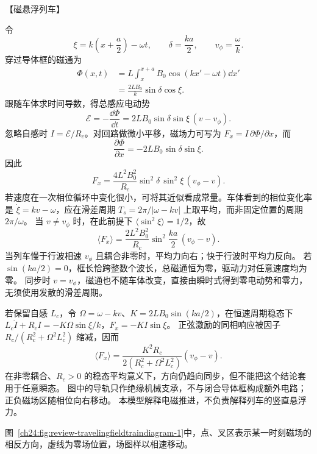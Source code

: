 {\begin{origexamplebox}{【磁悬浮列车】}
\end{origexamplebox}

\begin{xesolution}
\par\noindent\begin{minipage}{\linewidth}
\travelingFieldTrainDiagram
{}
\end{minipage}\par\medskip

令
\begin{equation}
  \xi=k\left(x+\frac a2\right)-\omega t,
  \qquad
  \delta=\frac{ka}{2},
  \qquad
  v_\phi=\frac\omega k.
\end{equation}
穿过导体框的磁通为
\begin{align}
  \Phi(x,t)
  &=L\int_x^{x+a}B_0\cos(kx'-\omega t)\dd x'\\
  &=\frac{2LB_0}{k}\sin\delta\cos\xi.
\end{align}
跟随车体求时间导数，得总感应电动势
\begin{equation}
  \mathcal E=-\frac{\dd\Phi}{\dd t}
  =2LB_0\sin\delta\sin\xi\,(v-v_\phi).
\end{equation}
忽略自感时 $I=\mathcal E/R_c$。对回路做微小平移，磁场力可写为 $F_x=I\,\partial\Phi/\partial x$，而
\begin{equation}
  \frac{\partial\Phi}{\partial x}=-2LB_0\sin\delta\sin\xi.
\end{equation}
因此
\begin{equation}
  \boxed{F_x=\frac{4L^2B_0^2}{R_c}\sin^2\!\delta\,\sin^2\!\xi\,(v_\phi-v)}.
\end{equation}
若速度在一次相位循环中变化很小，可将其近似看成常量。车体看到的相位变化率是
$\dot\xi=kv-\omega$，应在滑差周期 $T_s=2\pi/|\omega-kv|$ 上取平均，而非固定位置的周期 $2\pi/\omega$。
当 $v\ne v_\phi$ 时，在此前提下 $\langle\sin^2\xi\rangle=1/2$，故
\begin{equation}
  \boxed{\langle F_x\rangle=\frac{2L^2B_0^2}{R_c}
  \sin^2\!\frac{ka}{2}\,(v_\phi-v)}.
\end{equation}
当列车慢于行波相速 $v_\phi$ 且耦合非零时，平均力向右；快于行波时平均力反向。
若 $\sin(ka/2)=0$，框长恰跨整数个波长，总磁通恒为零，驱动力对任意速度均为零。
同步时 $v=v_\phi$，磁通也不随车体改变，直接由瞬时式得到零电动势和零力，无须使用发散的滑差周期。

若保留自感 $L_c$，令 $\Omega=\omega-kv$、$K=2LB_0\sin(ka/2)$，在恒速周期稳态下
$L_c\dot I+R_cI=-K\Omega\sin\xi/k$，$F_x=-KI\sin\xi$。
正弦激励的同相响应被因子 $R_c/(R_c^2+\Omega^2L_c^2)$ 缩减，因而
\[
 \langle F_x\rangle=
 \frac{K^2R_c}{2(R_c^2+\Omega^2L_c^2)}(v_\phi-v).
\]
在非零耦合、$R_c>0$ 的稳态平均意义下，方向仍趋向同步，但不能把这个结论套用于任意瞬态。
图中的导轨只作绝缘机械支承，不与闭合导体框构成额外电路；正负磁场区随相位向右移动。
本模型解释电磁推进，不负责解释列车的竖直悬浮力。

图~\ref{ch24:fig:review-travelingfieldtraindiagram-1}中，点、叉区表示某一时刻磁场的相反方向，虚线为零场位置，场图样以相速移动。

\end{xesolution}
}

\endgroup
